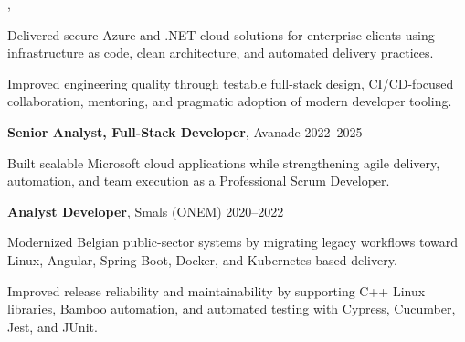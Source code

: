 \textbf{\ExperienceCurrentTitle}, \ExperienceCompany \hfill \ExperienceCurrentDates\par
\begin{resumeItems}
\item Delivered secure Azure and .NET cloud solutions for enterprise clients using infrastructure as code, clean architecture, and automated delivery practices.
\item Improved engineering quality through testable full-stack design, CI/CD-focused collaboration, mentoring, and pragmatic adoption of modern developer tooling.
\end{resumeItems}
\textbf{Senior Analyst, Full-Stack Developer}, Avanade \hfill 2022--2025\par
\begin{resumeItems}
\item Built scalable Microsoft cloud applications while strengthening agile delivery, automation, and team execution as a Professional Scrum Developer.
\end{resumeItems}
\textbf{Analyst Developer}, Smals (ONEM) \hfill 2020--2022\par
\begin{resumeItems}
\item Modernized Belgian public-sector systems by migrating legacy workflows toward Linux, Angular, Spring Boot, Docker, and Kubernetes-based delivery.
\item Improved release reliability and maintainability by supporting C++ Linux libraries, Bamboo automation, and automated testing with Cypress, Cucumber, Jest, and JUnit.
\end{resumeItems}
